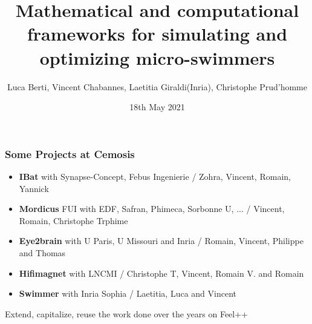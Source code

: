 \documentclass{beamer}
\institute[IRMA]{Cemosis, IRMA\\ Université de Strasbourg}
\title{Mathematical and computational frameworks for simulating and optimizing  micro-swimmers}
\author[Berti, Chabannes, Giraldi, Prud'homme]{Luca Berti, Vincent Chabannes, Laetitia Giraldi(Inria), Christophe Prud'homme}
\date{18th May 2021}
\begin{document}
		{
			\begin{frame}[plain]
				\maketitle
			\end{frame}
	}
\begin{frame}
	\frametitle{Some Projects at Cemosis}

	\begin{itemize}
		\item \textbf{IBat} with Synapse-Concept, Febus Ingenierie / Zohra, Vincent, Romain, Yannick 
		\item \textbf{Mordicus} FUI with EDF, Safran, Phimeca, Sorbonne U, ... / Vincent, Romain, Christophe Trphime
		\item \textbf{Eye2brain} with U Paris, U Missouri and Inria / Romain, Vincent, Philippe and Thomas
		\item \textbf{Hifimagnet} with LNCMI / Christophe T, Vincent, Romain V. and Romain 
		\item \textbf{Swimmer} with Inria Sophia / Laetitia, Luca and Vincent
	\end{itemize}
	\begin{alertblock}{}
		Extend, capitalize,  reuse  the work done over the years on Feel++
	\end{alertblock}
\end{frame}
\end{document}
